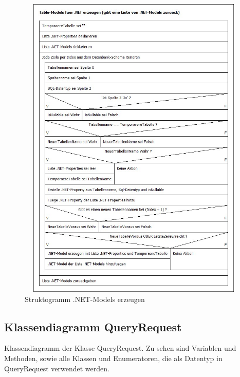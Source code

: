 \documentclass[11pt,toc=sectionentrywithoutdots, 
headheight=44pt, headings=optiontoheadandtoc, hyperfootnotes=false, hypertexnames=false]{scrartcl}
\begin{document}
 \begin{figure}[H]
 \centering
	\includegraphics[height=560, width=470]{struktogramm.png}
	 \caption{Struktogramm .NET-Models erzeugen}
 \end{figure}
 \clearpage
 
\subsection{Klassendiagramm QueryRequest}
Klassendiagramm der Klasse QueryRequest. Zu sehen sind Variablen und Methoden, sowie alle Klassen und Enumeratoren, die als Datentyp in QueryRequest verwendet werden.
 \label{fig:Klassendiagramm}
\end{document}
